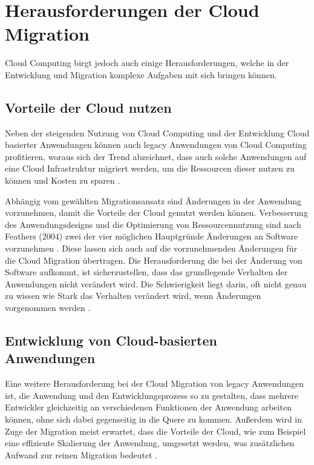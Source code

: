 \section{Herausforderungen der Cloud Migration}
\label{sec:herausforderungen}


Cloud Computing birgt jedoch auch einige Herausforderungen, welche in der Entwicklung und Migration komplexe Aufgaben mit sich bringen können.

\subsection{Vorteile der Cloud nutzen}

Neben der steigenden Nutzung von Cloud Computing und der Entwicklung Cloud basierter Anwendungen können auch legacy Anwendungen von Cloud Computing profitieren, woraus sich der Trend abzeichnet, dass auch solche Anwendungen auf eine Cloud Infrastruktur migriert werden, um die Ressourcen dieser nutzen zu können und Kosten zu sparen \cite[Vgl.][S. 31]{Maenhaut2016}.

Abhängig vom gewählten Migrationsansatz sind Änderungen in der Anwendung vorzunehmen, damit die Vorteile der Cloud genutzt werden können. Verbesserung des Anwendungsdesigns und die Optimierung von Ressourcennutzung sind nach Feathers (2004) zwei der vier möglichen Hauptgründe Änderungen an Software vorzunehmen \cite[Vgl.][S. 3]{Feathers2004}. Diese lassen sich auch auf die vorzunehmenden Änderungen für die Cloud Migration übertragen. Die Herausforderung die bei der Änderung von Software aufkommt, ist sicherzustellen, dass das grundlegende Verhalten der Anwendungen nicht verändert wird. Die Schwierigkeit liegt darin, oft nicht genau zu wissen wie Stark das Verhalten verändert wird, wenn Änderungen vorgenommen werden \cite[Vgl.][S. 7]{Feathers2004}. 

\subsection{Entwicklung von Cloud-basierten Anwendungen}

Eine weitere Herausforderung bei der Cloud Migration von legacy Anwendungen ist, die Anwendung und den Entwicklungsprozess so zu gestalten, dass mehrere Entwickler gleichzeitig an verschiedenen Funktionen der Anwendung arbeiten können, ohne sich dabei gegenseitig in die Quere zu kommen. Außerdem wird in Zuge der Migration meist erwartet, dass die Vorteile der Cloud, wie zum Beispiel eine effiziente Skalierung der Anwendung, umgesetzt werden, was zusätzlichen Aufwand zur reinen Migration bedeutet \cite[Vgl.][]{Ibryam2021}. \pagebreak

